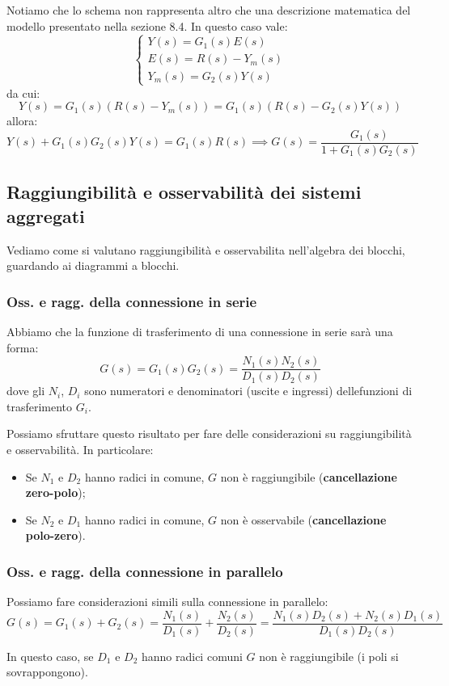 \documentclass[a4paper,11pt]{article}
\begin{document}
Notiamo che lo schema non rappresenta altro che una descrizione matematica del modello presentato nella sezione 8.4.
In questo caso vale:
\[
	\begin{cases}	
		Y(s) = G_1(s) E(s) \\
		E(s) = R(s) - Y_m(s) \\
		Y_m(s) = G_2(s) Y(s)
	\end{cases}
\]
da cui:
$$
Y(s) = G_1(s) \left( R(s) - Y_m(s) \right) = G_1(s) \left( R(s) - G_2(s)Y(s) \right)
$$
allora:
$$
Y(s) + G_1(s)G_2(s) Y(s) = G_1(s) R(s) \implies G(s) = \frac{G_1(s)}{1 + G_1(s) G_2(s)}
$$

\subsection{Raggiungibilità e osservabilità dei sistemi aggregati}
Vediamo come si valutano raggiungibilità e osservabilita nell'algebra dei blocchi, guardando ai diagrammi a blocchi.

\subsubsection{Oss. e ragg. della connessione in serie}
Abbiamo che la funzione di trasferimento di una connessione in serie sarà una forma:
$$
G(s) = G_1(s) G_2(s) = \frac{N_1(s)N_2(s)}{D_1(s)D_2(s)}
$$
dove gli $N_i$, $D_i$ sono numeratori e denominatori (uscite e ingressi) dellefunzioni di trasferimento $G_i$.

Possiamo sfruttare questo risultato per fare delle considerazioni su raggiungibilità e osservabilità. In particolare:
\begin{itemize}
	\item Se $N_1$ e $D_2$ hanno radici in comune, $G$ non è raggiungibile (\textbf{cancellazione zero-polo});
	\item Se $N_2$ e $D_1$ hanno radici in comune, $G$ non è osservabile (\textbf{cancellazione polo-zero}).
\end{itemize}

\subsubsection{Oss. e ragg. della connessione in parallelo}
Possiamo fare considerazioni simili sulla connessione in parallelo:
$$
G(s) = G_1(s) + G_2(s) = \frac{N_1(s)}{D_1(s)} + \frac{N_2(s)}{D_2(s)} = \frac{N_1(s)D_2(s) + N_2(s)D_1(s)}{D_1(s)D_2(s)}
$$

In questo caso, se $D_1$ e $D_2$ hanno radici comuni $G$ non è raggiungibile (i poli si sovrappongono). 
\end{document}
